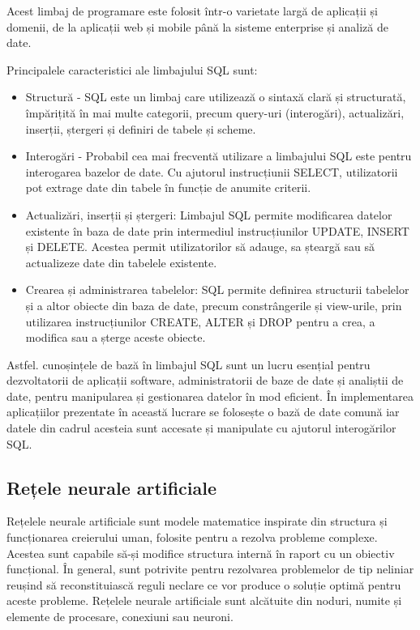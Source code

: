 \documentclass[12pt]{article}
\begin{document}
Acest limbaj de programare este folosit \^{i}ntr-o varietate larg\u{a} de aplicații și domenii, de la aplicații web și mobile p\^{a}n\u{a} la sisteme enterprise și analiz\u{a} de date.

Principalele caracteristici ale limbajului SQL sunt:

\begin{itemize}
    \item Structur\u{a} - SQL este un limbaj care utilizeaz\u{a} o sintax\u{a} clar\u{a} și structurat\u{a}, \^{i}mp\u{a}rițit\u{a} \^{i}n mai multe categorii, precum query-uri (interog\u{a}ri), actualiz\u{a}ri, inserții, ștergeri și definiri de tabele și scheme. 
    \item Interog\u{a}ri - Probabil cea mai frecvent\u{a} utilizare a limbajului SQL este pentru interogarea bazelor de date. Cu ajutorul instrucțiunii SELECT, utilizatorii pot extrage date din tabele \^{i}n funcție de anumite criterii.
    \item Actualiz\u{a}ri, inserții și ștergeri: Limbajul SQL permite modificarea datelor existente \^{i}n baza de date prin intermediul instrucțiunilor UPDATE, INSERT și DELETE. Acestea permit utilizatorilor s\u{a} adauge, sa ștearg\u{a} sau s\u{a} actualizeze date din tabelele existente.
    \item Crearea și administrarea tabelelor: SQL permite definirea structurii tabelelor și a altor obiecte din baza de date, precum constr\^{a}ngerile și view-urile, prin utilizarea instrucțiunilor CREATE, ALTER și DROP pentru a crea, a modifica sau a șterge aceste obiecte.
\end{itemize}

Astfel. cunoșințele de baz\u{a} \^{i}n limbajul SQL sunt un lucru esențial pentru dezvoltatorii de aplicații software, administratorii de baze de date și analiștii de date, pentru manipularea și gestionarea datelor \^{i}n mod eficient. \^{I}n implementarea aplicațiilor prezentate \^{i}n aceast\u{a} lucrare se folosește o baz\u{a} de date comun\u{a} iar datele din cadrul acesteia sunt accesate și manipulate cu ajutorul interog\u{a}rilor SQL.

\subsection{Rețele neurale artificiale}

Rețelele neurale artificiale sunt modele matematice inspirate din structura și funcționarea creierului uman, folosite pentru a rezolva probleme complexe. Acestea sunt capabile s\u{a}-și modifice structura intern\u{a} \^{i}n raport cu un obiectiv funcțional. \^{I}n general, sunt potrivite pentru rezolvarea problemelor de tip neliniar reușind s\u{a} reconstituiasc\u{a} reguli neclare ce vor produce o soluție optim\u{a} pentru aceste probleme. Rețelele neurale artificiale sunt alc\u{a}tuite din noduri, numite și elemente de procesare, conexiuni sau neuroni.
\end{document}
